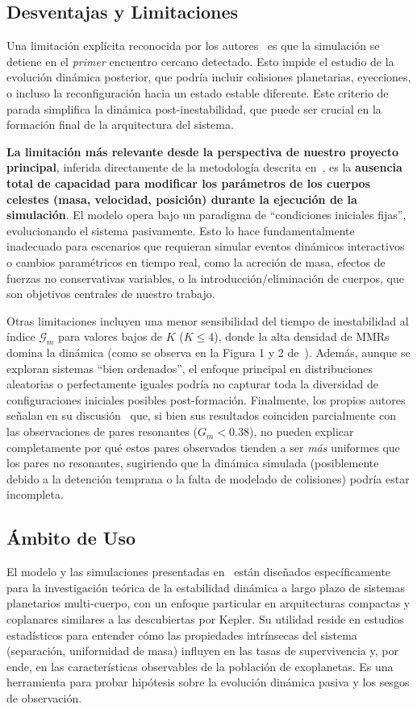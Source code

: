 \subsection[Desventajas y Limitaciones]{Desventajas y Limitaciones}
Una limitación explícita reconocida por los autores~\cite{Wu2025} es que la simulación se detiene en el \textit{primer} encuentro cercano detectado. Esto impide el estudio de la evolución dinámica posterior, que podría incluir colisiones planetarias, eyecciones, o incluso la reconfiguración hacia un estado estable diferente. Este criterio de parada simplifica la dinámica post-inestabilidad, que puede ser crucial en la formación final de la arquitectura del sistema.

\textbf{La limitación más relevante desde la perspectiva de nuestro proyecto principal}, inferida directamente de la metodología descrita en~\cite{Wu2025}, es la \textbf{ausencia total de capacidad para modificar los parámetros de los cuerpos celestes (masa, velocidad, posición) durante la ejecución de la simulación}. El modelo opera bajo un paradigma de ``condiciones iniciales fijas'', evolucionando el sistema pasivamente. Esto lo hace fundamentalmente inadecuado para escenarios que requieran simular eventos dinámicos interactivos o cambios paramétricos en tiempo real, como la acreción de masa, efectos de fuerzas no conservativas variables, o la introducción/eliminación de cuerpos, que son objetivos centrales de nuestro trabajo.

Otras limitaciones incluyen una menor sensibilidad del tiempo de inestabilidad al índice $\mathcal{G}_m$ para valores bajos de $K$ ($K \leq 4$), donde la alta densidad de MMRs domina la dinámica (como se observa en la Figura 1 y 2 de~\cite{Wu2025}). Además, aunque se exploran sistemas ``bien ordenados'', el enfoque principal en distribuciones aleatorias o perfectamente iguales podría no capturar toda la diversidad de configuraciones iniciales posibles post-formación. Finalmente, los propios autores señalan en su discusión~\cite{Wu2025} que, si bien sus resultados coinciden parcialmente con las observaciones de pares resonantes ($G_m < 0.38$), no pueden explicar completamente por qué estos pares observados tienden a ser \textit{más} uniformes que los pares no resonantes, sugiriendo que la dinámica simulada (posiblemente debido a la detención temprana o la falta de modelado de colisiones) podría estar incompleta.

\subsection[Ámbito de Uso]{Ámbito de Uso}
El modelo y las simulaciones presentadas en~\cite{Wu2025} están diseñados específicamente para la investigación teórica de la estabilidad dinámica a largo plazo de sistemas planetarios multi-cuerpo, con un enfoque particular en arquitecturas compactas y coplanares similares a las descubiertas por Kepler. Su utilidad reside en estudios estadísticos para entender cómo las propiedades intrínsecas del sistema (separación, uniformidad de masa) influyen en las tasas de supervivencia y, por ende, en las características observables de la población de exoplanetas. Es una herramienta para probar hipótesis sobre la evolución dinámica pasiva y los sesgos de observación.

